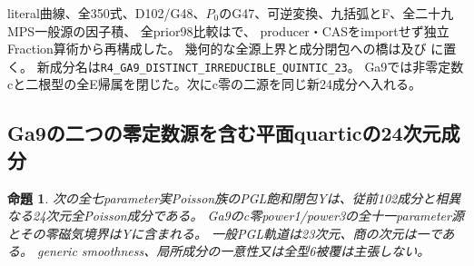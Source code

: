 \documentclass[a4paper,11pt]{ltjsarticle}
\newtheorem{proposition}{命題}[section]
\theoremstyle{definition}
\begin{document}
literal曲線、全350式、D102/G48、$P_0$のG47、可逆変換、九括弧とF、全二十九MPS一般源の因子積、
全prior98比較はで、
producer・CASをimportせず独立Fraction算術から再構成した。
幾何的な全源上界と成分閉包への橋は及び
に置く。
新成分名は\texttt{R4\_GA9\_DISTINCT\_IRREDUCIBLE\_QUINTIC\_23}。
Ga9では非零定数cと二根型の全E帰属を閉じた。次にc零の二源を同じ新24成分へ入れる。

\subsection{Ga9の二つの零定数源を含む平面quarticの24次元成分}
\begin{proposition}\label{prop:Ga9-cuspidal-quartic-component}
次の全七parameter実Poisson族のPGL飽和閉包Yは、従前102成分と相異なる24次元全Poisson成分である。
Ga9のc零power1/power3の全十一parameter源とその零磁気境界はYに含まれる。
一般PGL軌道は23次元、商の次元は一である。
generic smoothness、局所成分の一意性又は全型6被覆は主張しない。
\end{proposition}
\end{document}
